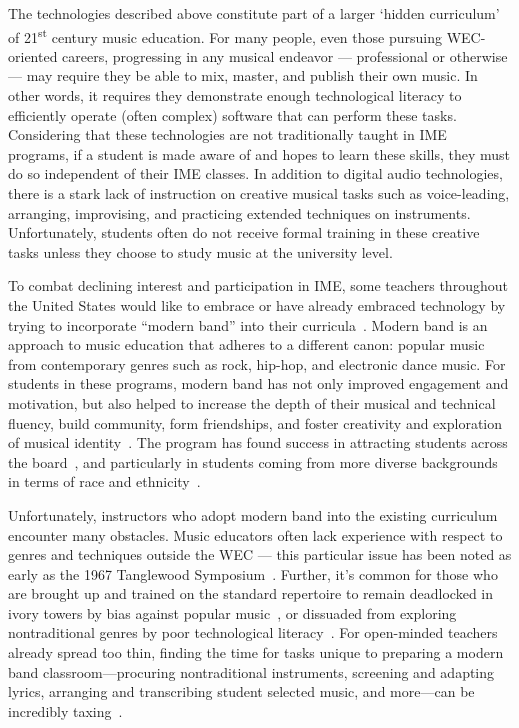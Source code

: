 \documentclass[manuscript,screen,review]{acmart}
\begin{document}
The technologies described above constitute part of a larger `hidden curriculum' of 21\textsuperscript{st} century music education. 
For many people, even those pursuing WEC-oriented careers, progressing in any musical endeavor --- professional or otherwise --- may require they be able to mix, master, and publish their own music.
In other words, it requires they demonstrate enough technological literacy to efficiently operate (often complex) software that can perform these tasks.
Considering that these technologies are not traditionally taught in IME programs, if a student is made aware of and hopes to learn these skills, they must do so independent of their IME classes.
In addition to digital audio technologies, there is a stark lack of instruction on creative musical tasks such as voice-leading, arranging, improvising, and practicing extended techniques on instruments.
Unfortunately, students often do not receive formal training in these creative tasks unless they choose to study music at the university level.

To combat declining interest and participation in IME, some teachers throughout the United States would like to embrace or have already embraced technology by trying to incorporate ``modern band'' into their curricula~\cite{Dammers}.
Modern band is an approach to music education that adheres to a different canon: popular music from contemporary genres such as rock, hip-hop, and electronic dance music.
For students in these programs, modern band has not only improved engagement and motivation, but also helped to increase the depth of their musical and technical fluency, build community, form friendships, and foster creativity and exploration of musical identity~\cite{Vasil23}.
The program has found success in attracting students across the board~\cite{NelsonKelly}, and particularly in students coming from more diverse backgrounds in terms of race and ethnicity~\cite{Vasil23}.

Unfortunately, instructors who adopt modern band into the existing curriculum encounter many obstacles.
Music educators often lack experience with respect to genres and techniques outside the WEC ---
this particular issue has been noted as early as the 1967 Tanglewood Symposium~\cite{Lehman20, Vasil23}.
Further, it's common for those who are brought up and trained on the standard repertoire to remain deadlocked in ivory towers by bias against popular music~\cite{ClauhsSanguinetti}, or dissuaded from exploring nontraditional genres by poor technological literacy~\cite{Bannerman}.
For open-minded teachers already spread too thin, finding the time for tasks unique to preparing a modern band classroom---procuring nontraditional instruments, screening and adapting lyrics, arranging and transcribing student selected music, and more---can be incredibly taxing~\cite{Vasil23}. 
\end{document}
